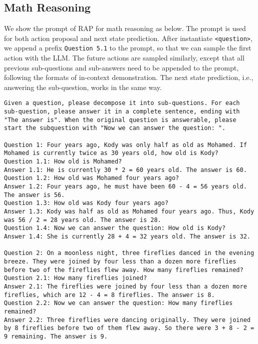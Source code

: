 \subsection{Math Reasoning}
We show the prompt of RAP for math reasoning as below. The prompt is used for both action proposal and next state prediction. After instantiate \texttt{<question>}, we append a prefix \texttt{Question 5.1} to the prompt, so that we can sample the first action with the LLM. The future actions are sampled similarly, except that all previous sub-questions and sub-answers need to be appended to the prompt, following the formats of in-context demonstration. The next state prediction, i.e., answering the sub-question, works in the same way.

\begin{lstlisting}[breaklines=true,breakatwhitespace=true]
Given a question, please decompose it into sub-questions. For each sub-question, please answer it in a complete sentence, ending with "The answer is". When the original question is answerable, please start the subquestion with "Now we can answer the question: ".

Question 1: Four years ago, Kody was only half as old as Mohamed. If Mohamed is currently twice as 30 years old, how old is Kody?
Question 1.1: How old is Mohamed?
Answer 1.1: He is currently 30 * 2 = 60 years old. The answer is 60.
Question 1.2: How old was Mohamed four years ago?
Answer 1.2: Four years ago, he must have been 60 - 4 = 56 years old. The answer is 56.
Question 1.3: How old was Kody four years ago?
Answer 1.3: Kody was half as old as Mohamed four years ago. Thus, Kody was 56 / 2 = 28 years old. The answer is 28.
Question 1.4: Now we can answer the question: How old is Kody?
Answer 1.4: She is currently 28 + 4 = 32 years old. The answer is 32.

Question 2: On a moonless night, three fireflies danced in the evening breeze. They were joined by four less than a dozen more fireflies before two of the fireflies flew away. How many fireflies remained?
Question 2.1: How many fireflies joined?
Answer 2.1: The fireflies were joined by four less than a dozen more fireflies, which are 12 - 4 = 8 fireflies. The answer is 8.
Question 2.2: Now we can answer the question: How many fireflies remained?
Answer 2.2: Three fireflies were dancing originally. They were joined by 8 fireflies before two of them flew away. So there were 3 + 8 - 2 = 9 remaining. The answer is 9.


\end{lstlisting}
